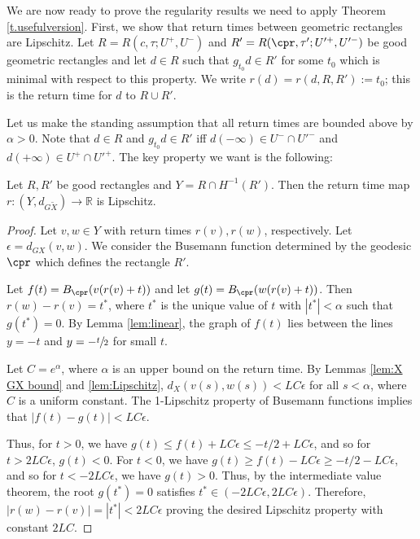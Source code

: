 We are now ready to prove the regularity results we need to apply Theorem \ref{t.usefulversion}. First, we show that return times between geometric rectangles are Lipschitz. Let $R=R(c, \tau; U^+, U^-)$ and $R'=R(\cpr, \tau'; U'^+, U'^-)$ be good geometric rectangles and let $d\in R$ such that $g_{t_0}d \in R'$ for some $t_0$ which is minimal with respect to this property. We write $r(d)=r(d, R, R') :=t_0$; this is the return time for $d$ to $R \cup R'$.

Let us make the standing assumption that all return times are bounded above by $\alpha>0$. Note that $d\in R$ and $g_{t_0}d \in R'$ iff $d(-\infty)\in U^-\cap U'^-$ and $d(+\infty)\in U^+\cap U'^+$. The key property we want is the following:

\begin{prop}\label{prop:Lipschitz}
Let $R, R'$ be good rectangles and $Y= R \cap H^{-1}(R')$. Then the return time map $r:(Y, d_{G\tilde X}) \to \mathbb{R}$ is Lipschitz.
\end{prop}

\begin{proof}

Let $v,w \in Y$ with return times $r(v), r(w)$, respectively. Let $\epsilon = d_{GX}(v,w)$. We consider the Busemann function determined by the geodesic $\cpr$ which defines the rectangle $R'$.

Let $f(t) = B_{\cpr}(v(r(v)+t))$ and let $g(t) = B_{\cpr}(w(r(v)+t))$. Then $r(w)-r(v) = t^*$, where $t^*$ is the unique value of $t$ with $|t^\ast|< \alpha$ such that $g(t^\ast) = 0$. By Lemma \ref{lem:linear}, the graph of $f(t)$ lies between the lines $y=-t$ and $y=-\sfrac{t}{2}$ for small $t$.

Let $C = e^\alpha$, where $\alpha$ is an upper bound on the return time. By Lemmas \ref{lem:X GX bound} and \ref{lem:Lipschitz}, $d_X(v(s), w(s))<LC\epsilon$ for all $s<\alpha$, where $C$ is a uniform constant. The 1-Lipschitz property of Busemann functions implies that $|f(t)-g(t)| < LC\epsilon$.

Thus, for $t>0$, we have $g(t)\leq f(t)+LC \epsilon \leq -t/2 +LC\epsilon$, and so for $t>2LC \epsilon$, $g(t)<0$. For $t<0$, we have $g(t) \geq f(t)-LC \epsilon \geq -t/2-LC \epsilon$, and so for $t<-2LC \epsilon$, we have $g(t)>0$. Thus, by the intermediate value theorem, the root $g(t^\ast)=0$ satisfies $t^\ast \in (-2LC\epsilon, 2LC \epsilon)$. Therefore, $|r(w)-r(v)| = |t^\ast| < 2LC\epsilon$ proving the desired Lipschitz property with constant $2LC$.
\end{proof}


